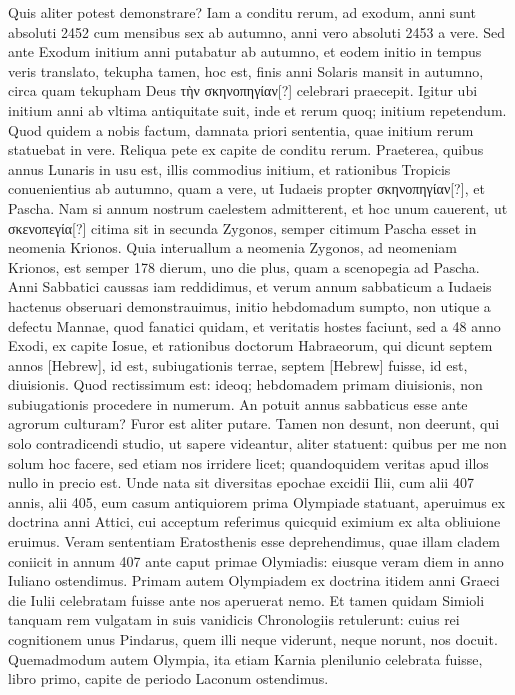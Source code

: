 Quis aliter potest demonstrare?
Iam a conditu rerum, ad exodum,
anni sunt absoluti 2452 cum mensibus sex ab autumno, anni vero
absoluti 2453 a vere.
Sed ante Exodum initium anni putabatur ab
autumno, et eodem initio in tempus veris translato, tekupha tamen,
hoc est, finis anni Solaris mansit in autumno, circa quam tekupham
Deus \textgreek{τὴν σκηνοπηγίαν[?]} celebrari praecepit.
Igitur ubi initium anni
ab vltima antiquitate suit, inde et rerum quoq; initium repetendum.
Quod quidem a nobis factum, damnata priori sententia, quae
initium rerum statuebat in vere.
Reliqua pete ex capite de conditu
rerum.
Praeterea, quibus annus Lunaris in usu est, illis commodius
initium, et rationibus Tropicis conuenientius ab autumno, quam
a vere, ut Iudaeis propter \textgreek{σκηνοπηγίαν[?]}, et Pascha.
Nam si annum
nostrum caelestem admitterent, et hoc unum cauerent, ut \textgreek{σκενοπεγία[?]}
citima sit in secunda Zygonos, semper citimum Pascha esset in neomenia
Krionos.
Quia interuallum a neomenia Zygonos, ad neomeniam
Krionos, est semper 178 dierum, uno die plus, quam a scenopegia
ad Pascha.
Anni Sabbatici caussas iam reddidimus, et verum
annum sabbaticum a Iudaeis hactenus obseruari demonstrauimus,
initio hebdomadum sumpto, non utique a defectu Mannae,
quod fanatici quidam, et veritatis hostes faciunt, sed a 48 anno Exodi,
ex capite  Iosue, et rationibus doctorum Habraeorum, qui
dicunt septem annos \texthebrew{[Hebrew]}, id est, subiugationis terrae,
septem \texthebrew{[Hebrew]}
fuisse, id est, diuisionis.
Quod rectissimum est: ideoq; hebdomadem
primam diuisionis, non subiugationis procedere in numerum.
An
potuit annus sabbaticus esse ante agrorum culturam?
Furor est aliter putare.
Tamen non desunt, non deerunt, qui solo contradicendi
studio, ut sapere videantur, aliter statuent: quibus per me non solum
hoc facere, sed etiam nos irridere licet; quandoquidem veritas apud
illos nullo in precio est.
Unde nata sit diversitas epochae excidii Ilii,
cum alii 407 annis, alii 405, eum casum antiquiorem prima Olympiade
statuant, aperuimus ex doctrina anni Attici, cui acceptum
referimus quicquid eximium ex alta obliuione eruimus.
Veram sententiam
Eratosthenis esse deprehendimus, quae illam cladem coniicit
in annum 407 ante caput primae Olymiadis: eiusque veram
diem in anno Iuliano ostendimus.
Primam autem Olympiadem
ex doctrina itidem anni Graeci  die Iulii celebratam fuisse ante
nos aperuerat nemo.
Et tamen quidam Simioli tanquam rem
vulgatam in suis vanidicis Chronologiis retulerunt: cuius rei cognitionem
unus Pindarus, quem illi neque viderunt, neque norunt, nos
docuit.
Quemadmodum autem Olympia, ita etiam Karnia plenilunio
celebrata fuisse, libro primo, capite de periodo Laconum
ostendimus.

